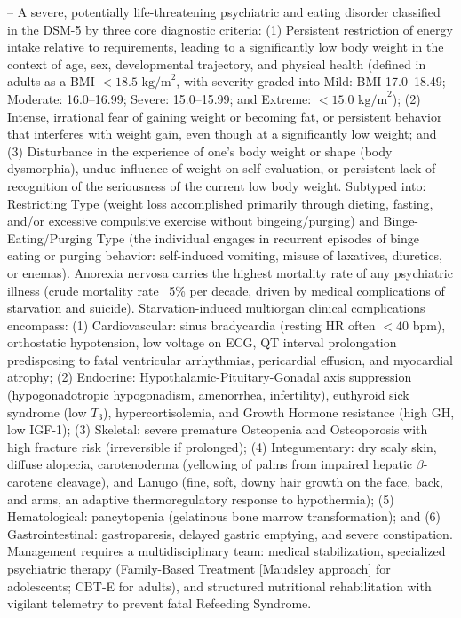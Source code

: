 -- A severe, potentially life-threatening psychiatric and eating disorder classified in the DSM-5 by three core diagnostic criteria: (1) Persistent restriction of energy intake relative to requirements, leading to a significantly low body weight in the context of age, sex, developmental trajectory, and physical health (defined in adults as a BMI $<18.5\text{ kg/m}^2$, with severity graded into Mild: BMI 17.0--18.49; Moderate: 16.0--16.99; Severe: 15.0--15.99; and Extreme: $<15.0\text{ kg/m}^2$); (2) Intense, irrational fear of gaining weight or becoming fat, or persistent behavior that interferes with weight gain, even though at a significantly low weight; and (3) Disturbance in the experience of one's body weight or shape (body dysmorphia), undue influence of weight on self-evaluation, or persistent lack of recognition of the seriousness of the current low body weight. Subtyped into: Restricting Type (weight loss accomplished primarily through dieting, fasting, and/or excessive compulsive exercise without bingeing/purging) and Binge-Eating/Purging Type (the individual engages in recurrent episodes of binge eating or purging behavior: self-induced vomiting, misuse of laxatives, diuretics, or enemas). Anorexia nervosa carries the highest mortality rate of any psychiatric illness (crude mortality rate ~5\% per decade, driven by medical complications of starvation and suicide). Starvation-induced multiorgan clinical complications encompass: (1) Cardiovascular: sinus bradycardia (resting HR often $<40$ bpm), orthostatic hypotension, low voltage on ECG, QT interval prolongation predisposing to fatal ventricular arrhythmias, pericardial effusion, and myocardial atrophy; (2) Endocrine: Hypothalamic-Pituitary-Gonadal axis suppression (hypogonadotropic hypogonadism, amenorrhea, infertility), euthyroid sick syndrome (low $T_3$), hypercortisolemia, and Growth Hormone resistance (high GH, low IGF-1); (3) Skeletal: severe premature Osteopenia and Osteoporosis with high fracture risk (irreversible if prolonged); (4) Integumentary: dry scaly skin, diffuse alopecia, carotenoderma (yellowing of palms from impaired hepatic $\beta$-carotene cleavage), and Lanugo (fine, soft, downy hair growth on the face, back, and arms, an adaptive thermoregulatory response to hypothermia); (5) Hematological: pancytopenia (gelatinous bone marrow transformation); and (6) Gastrointestinal: gastroparesis, delayed gastric emptying, and severe constipation. Management requires a multidisciplinary team: medical stabilization, specialized psychiatric therapy (Family-Based Treatment [Maudsley approach] for adolescents; CBT-E for adults), and structured nutritional rehabilitation with vigilant telemetry to prevent fatal Refeeding Syndrome.

